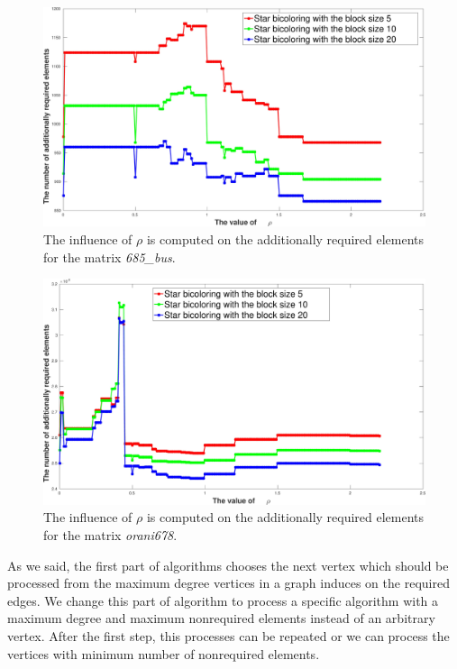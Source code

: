 \documentclass[12pt, twoside,a4paper,toc=bibliography]{scrbook}
\begin{document}
\begin{figure}
\includegraphics[width=0.9\linewidth]{rho_value_685_bus}
\caption{The influence of $\rho$ is computed on the additionally required elements
for the matrix \textit{685\_bus}.}
\label{rho_value_685_bus}
\end{figure}

\begin{figure}
\includegraphics[width=0.9\linewidth]{rho_value_orani678}
\caption{The influence of $\rho$ is computed on the additionally required elements
for the matrix \textit{orani678}.}
\label{rho_value_orani678}
\end{figure}

As we said, the first part of algorithms chooses the next vertex
which should be processed from the maximum degree vertices
in a graph induces on the required edges.
We change this part of algorithm to process a specific algorithm
with a maximum degree and maximum nonrequired elements instead of
an arbitrary vertex. After the first step, this processes can be
repeated or we can process the vertices with
minimum number of nonrequired elements.
\end{document}
